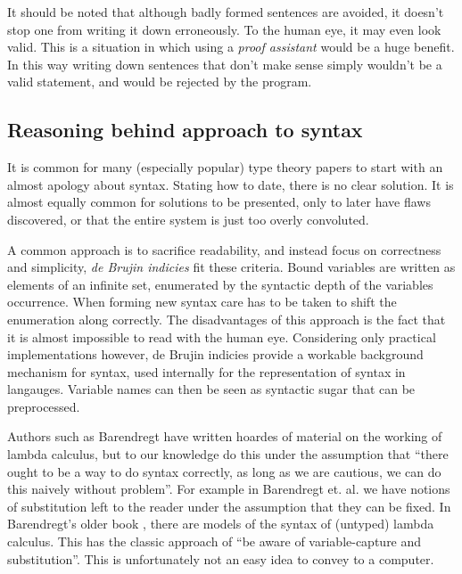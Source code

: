 \begin{remark}
    It should be noted that although badly formed sentences are avoided, it doesn't stop one from writing it down erroneously. To the human eye, it may even look valid. This is a situation in which using a \emph{proof assistant} would be a huge benefit. In this way writing down sentences that don't make sense simply wouldn't be a valid statement, and would be rejected by the program.
\end{remark}

\subsection{Reasoning behind approach to syntax}

It is common for many (especially popular) type theory papers to start with an almost apology about syntax. Stating how to date, there is no clear solution. It is almost equally common for solutions to be presented, only to later have flaws discovered, or that the entire system is just too overly convoluted.

A common approach is to sacrifice readability, and instead focus on correctness and simplicity, \emph{de Brujin indicies} \cite{DEBRUIJN1972381} fit these criteria. Bound variables are written as elements of an infinite set, enumerated by the syntactic depth of the variables occurrence. When forming new syntax care has to be taken to shift the enumeration along correctly. The disadvantages of this approach is the fact that it is almost impossible to read with the human eye. Considering only practical implementations however, de Brujin indicies provide a workable background mechanism for syntax, used internally for the representation of syntax in langauges. Variable names can then be seen as syntactic sugar that can be preprocessed.

Authors such as Barendregt have written hoardes of material on the working of lambda calculus, but to our knowledge do this under the assumption that ``there ought to be a way to do syntax correctly, as long as we are cautious, we can do this naively without problem''. For example in Barendregt et. al. \cite{BarendregtHenk2013Lcwt} we have notions of substitution left to the reader under the assumption that they can be fixed. In Barendregt's older book \cite{barendregt1984lambda}, there are models of the syntax of (untyped) lambda calculus. This has the classic approach of ``be aware of variable-capture and substitution''. This is unfortunately not an easy idea to convey to a computer.


